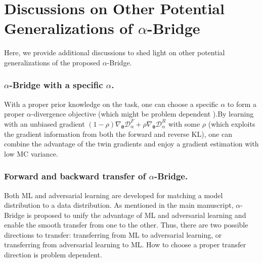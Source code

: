 \documentclass[letterpaper]{article} %
\newcommand{\Dc}[0]{\ensuremath{\mathcal{D}} }
\newcommand{\xv}[0]{\ensuremath{\boldsymbol{x}} }
\newcommand{\thetav}[0]{\ensuremath{\boldsymbol{\theta}} }
\begin{document}
\section{Discussions on Other Potential Generalizations of $\alpha$-Bridge}
\label{sec:other_poten_gener}



Here, we provide additional discussions to shed light on other potential generalizations of the proposed $\alpha$-Bridge.


\subsubsection{$\alpha$-Bridge with a specific $\alpha$.}
With a proper prior knowledge on the task, one can choose a specific $\alpha$ to form a proper $\alpha$-divergence objective (which might be problem dependent \cite{hernandez2016black,li2016renyi}).By learning with an unbiased gradient $(1-\rho) \nabla_{\thetav} \Dc_{\alpha}^F + \rho \nabla_{\thetav} \Dc_{\alpha}^R$ with some $\rho$ (which exploits the gradient information from both the forward and reverse KL), one can combine the advantage of the twin gradients and enjoy a gradient estimation with low MC variance.


\subsubsection{Forward and backward transfer of $\alpha$-Bridge.}
Both ML and adversarial learning are developed for matching a model distribution to a data distribution. As mentioned in the main manuscript, $\alpha$-Bridge is proposed to unify the advantage of ML and adversarial learning and enable the smooth transfer from one to the other. Thus, there are two possible directions to transfer: transferring from ML to adversarial learning, or transferring from adversarial learning to ML. How to choose a proper transfer direction is problem dependent.
\end{document}
